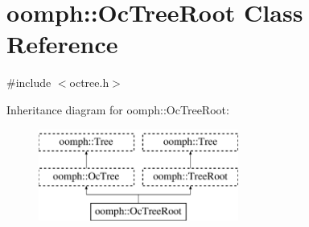 \hypertarget{classoomph_1_1OcTreeRoot}{}\section{oomph\+:\+:Oc\+Tree\+Root Class Reference}
\label{classoomph_1_1OcTreeRoot}


{\ttfamily \#include $<$octree.\+h$>$}

Inheritance diagram for oomph\+:\+:Oc\+Tree\+Root\+:\begin{figure}[H]
\begin{center}
\leavevmode
\includegraphics[height=3.000000cm]{classoomph_1_1OcTreeRoot}
\end{center}
\end{figure}
